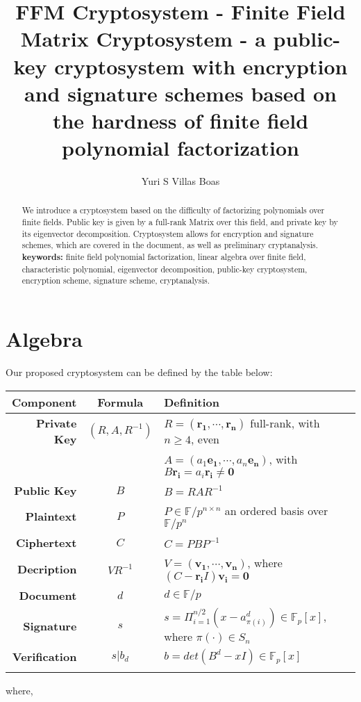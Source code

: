 \documentclass[a4paper,10pt]{article}
\theoremstyle{plain}
\theoremstyle{definition}
\theoremstyle{named}
\begin{document}
\title{FFM Cryptosystem - Finite Field Matrix Cryptosystem - a public-key cryptosystem with encryption and signature schemes based on the hardness of finite field polynomial factorization}
\author{Yuri S Villas Boas}

\maketitle

\begin{abstract}
We introduce a cryptosystem based on the difficulty of factorizing polynomials over finite fields. Public key is given by a full-rank Matrix over this field, and private key by its eigenvector decomposition. Cryptosystem allows for encryption and signature schemes, which are covered in the document, as well as preliminary cryptanalysis.\\

\textbf{keywords:} finite field polynomial factorization, linear algebra over finite field, characteristic polynomial, eigenvector decomposition, public-key cryptosystem, encryption scheme, signature scheme, cryptanalysis.
\end{abstract}

\section{Algebra}

Our proposed cryptosystem can be defined by the table below:
\begin{flushleft}
 \begin{tabular}{|r|c|l|}
    \hline
    \textbf{Component} & \textbf{Formula} & \textbf{Definition}\\
    \hline
     \textbf{Private Key} & $(R, A, R^{-1})$ & $R = \left(\mathbf{r_1}, \cdots, \mathbf{r_n}\right)$ full-rank, with $n \geq 4$, even\\
     &  & $A = \left(a_1\mathbf{e_1}, \cdots, a_n\mathbf{e_n} \right)$, with $B\mathbf{r_i} = a_i\mathbf{r_i} \neq \mathbf{0}$\\
     \hline
     \textbf{Public Key} & $B$ & $B = RAR^{-1}$\\
     \hline
        \textbf{Plaintext} & $P$ & $P\in \mathbb{F}/p^{n\times n}$ an ordered basis over $\mathbb{F}/p^n$\\
     \hline
    \textbf{Ciphertext} & $C$ & $C = PBP^{-1}$\\
     \hline
    \textbf{Decription} & $VR^{-1}$ & $V = \left(\mathbf{v_1}, \cdots, \mathbf{v_n}\right)$, where $\left(C-\mathbf{r_i}I\right)\mathbf{v_i} = \mathbf{0}$\\
     \hline
    \textbf{Document} & $d$ & $d \in \mathbb{F}/p$\\
     \hline
    \textbf{Signature} & $s$ & $s = \Pi_{i = 1}^{n/2} (x-a_{\pi(i)}^d) \in \mathbb{F}_p[x]$, where $\pi(\cdot) \in S_n$\\
     \hline
    \textbf{Verification} & $s | b_d$ & $b = det\left(B^d-xI\right) \in \mathbb{F}_p[x]$\\
    \hline
    \multicolumn{3}{c}{}
\label{tab:notation}
\end{tabular}
\end{flushleft}
where,
\end{document}
